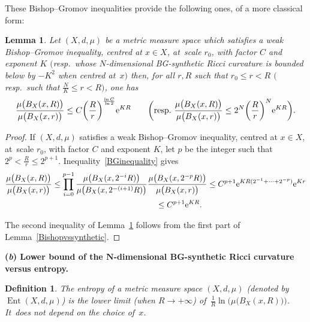 \documentclass[pdftex]{sigma}
\numberwithin{equation}{section}
\newtheorem{Lemma}[theor]{Lemma}
\newtheorem{defi}[theor]{Definition}
\newcommand{\Ent}{\operatorname{Ent}}
\begin{document}
These Bishop--Gromov inequalities provide the following ones, of a more classical form:

\begin{Lemma}\label{Bishopclassic}
Let $(X,d,\mu)$ be a metric measure space which satisfies a weak Bishop--Gromov ineq\-uality, centred at $x\in X$, at~scale $r_0$, with factor $C$
and exponent $K$ $($resp.\ whose $N$-dimensional BG-synthetic Ricci curvature is bounded below by $-K^2$ when centred at~$x)$ then, for all $r, R$
such that $ r_0 \le r < R$ $($resp.\ such that $\frac{N}{K} \le r < R)$, one has
\begin{gather*}
\dfrac{\mu \big( B_X(x, R)\big)}{\mu \big( B_X(x,r)\big)}
\le C \bigg(\dfrac{R}{r}\bigg)^{\frac{\ln C}{\ln 2}} {\rm e}^{K R}\qquad
\bigg(\text{resp.\ } \dfrac{\mu \big( B_X(x, R)\big)}{\mu \big( B_X(x,r)\big)} \le 2^N \bigg(\dfrac{R}{r}\bigg)^N {\rm e}^{KR}\bigg).
\end{gather*}
\end{Lemma}

\begin{proof} If $(X,d,\mu)$ satisfies a weak Bishop--Gromov inequality, centred at $x\in X$, at~scale $r_0$, with factor $C$ and exponent $K$,
let $p$ be the integer such that $2^p < \frac{R}{r} \le 2^{p+1}$. Inequality~\eqref{BGinequality} gives
\begin{gather*}
\dfrac{\mu \big( B_X(x, R)\big)}{\mu \big( B_X(x,r)\big)} \le \prod_{i=0}^{p-1} \dfrac{\mu \big( B_X(x, 2^{- i}R)\big)}{\mu \big( B_X(x, 2^{-(i+1)}R)\big)}
 \dfrac{\mu \big( B_X(x, 2^{- p}R)\big)}{\mu \big( B_X(x,r)\big)}
\le C^{p+1} {\rm e}^{KR (2^{-1}+ \cdots + 2^{- p})} {\rm e}^{K r}
\\ \hphantom{\dfrac{\mu \big( B_X(x, R)\big)}{\mu \big( B_X(x,r)\big)}}
{}\le C^{p+1} {\rm e}^{K R}.
\end{gather*}

The second inequality of Lemma~\ref{Bishopclassic} follows from the first part of Lemma~\ref{Bishopvssynthetic}.
\end{proof}

\medskip\noindent
{\bf (\emph{b}) Lower bound of the $\boldsymbol N$-dimensional BG-synthetic Ricci curvature versus entropy.}
\begin{defi}\label{Entropies0}
The entropy of a metric measure space $ (X,d, \mu) $ (denoted by $ \Ent (X,d, \mu) $) is the lower limit (when $ R \to +\infty $)
of~$ \frac{1}{R} \ln \big( \mu \big( B_X (x, R)\big) \big) $. It~does not depend on the choice of~$x$.
\end{defi}
\end{document}

